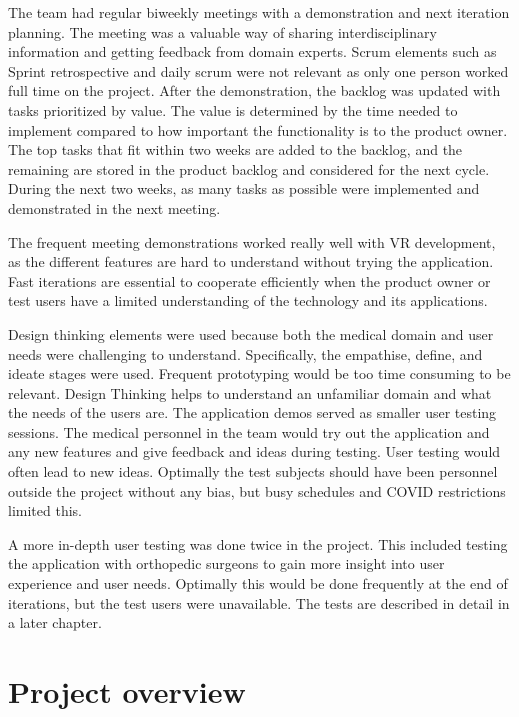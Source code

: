 \documentclass[a4paper]{report}
\begin{document}
The team had regular biweekly meetings with a demonstration and next iteration planning. The meeting was a valuable way of sharing interdisciplinary information and getting feedback from domain experts. Scrum elements such as Sprint retrospective and daily scrum were not relevant as only one person worked full time on the project.
After the demonstration, the backlog was updated with tasks prioritized by value. The value is determined by the time needed to implement compared to how important the functionality is to the product owner. The top tasks that fit within two weeks are added to the backlog, and the remaining are stored in the product backlog and considered for the next cycle.
During the next two weeks, as many tasks as possible were implemented and demonstrated in the next meeting.

The frequent meeting demonstrations worked really well with VR development, as the different features are hard to understand without trying the application. Fast iterations are essential to cooperate efficiently when the product owner or test users have a limited understanding of the technology and its applications.

Design thinking elements were used because both the medical domain and user needs were challenging to understand. Specifically, the empathise, define, and ideate stages were used. Frequent prototyping would be too time consuming to be relevant. Design Thinking helps to understand an unfamiliar domain and what the needs of the users are.
The application demos served as smaller user testing sessions. The medical personnel in the team would try out the application and any new features and give feedback and ideas during testing. User testing would often lead to new ideas. Optimally the test subjects should have been personnel outside the project without any bias, but busy schedules and COVID restrictions limited this.

A more in-depth user testing was done twice in the project. This included testing the application with orthopedic surgeons to gain more insight into user experience and user needs. Optimally this would be done frequently at the end of iterations, but the test users were unavailable. The tests are described in detail in a later chapter.

\section{Project overview}\label{CodeStructure}
\end{document}
